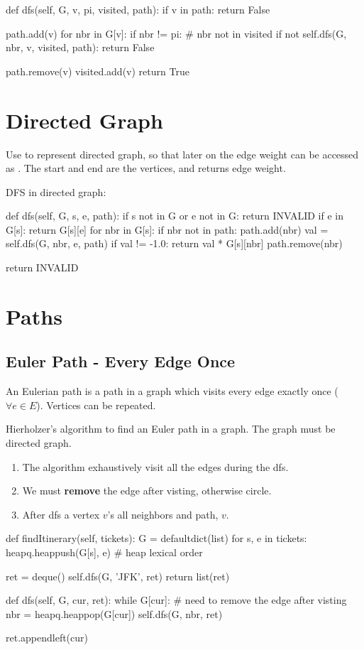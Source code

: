 \begin{python}
def dfs(self, G, v, pi, visited, path):
  if v in path:
    return False

  path.add(v)
  for nbr in G[v]:
    if nbr != pi:  # nbr not in visited
      if not self.dfs(G, nbr, v, visited, path):
        return False

  path.remove(v)
  visited.add(v)
  return True
\end{python}
\section{Directed Graph}
Use  to represent directed graph, so that later on the edge weight can be accessed as . The  start and  end are the vertices, and  returns edge weight.

 DFS in directed graph:
\begin{python}
def dfs(self, G, s, e, path):
    if s not in G or e not in G:
        return INVALID
    if e in G[s]:
        return G[s][e]
    for nbr in G[s]:
        if nbr not in path:
            path.add(nbr)
            val = self.dfs(G, nbr, e, path)
            if val != -1.0:
                return val * G[s][nbr]
            path.remove(nbr)

    return INVALID
\end{python}

\section{Paths}
\subsection{Euler Path - Every Edge Once} 
An Eulerian path is a path in a graph which visits every edge exactly once ($\forall e \in E$). Vertices can be repeated.

Hierholzer's algorithm to find an Euler path in a graph. The graph must be directed graph.

\begin{enumerate}
\item The algorithm exhaustively visit all the edges during the dfs. 
\item We must \textbf{remove} the edge after visting, otherwise circle.
\item After dfs a vertex $v$'s all neighbors and path,  $v$. 
\end{enumerate}
\begin{python}
def findItinerary(self, tickets):
    G = defaultdict(list)
    for s, e in tickets:
        heapq.heappush(G[s], e)  # heap lexical order

    ret = deque()
    self.dfs(G, 'JFK', ret)
    return list(ret)

def dfs(self, G, cur, ret):
    while G[cur]:
        # need to remove the edge after visting
        nbr = heapq.heappop(G[cur])
        self.dfs(G, nbr, ret)

    ret.appendleft(cur)
\end{python}

